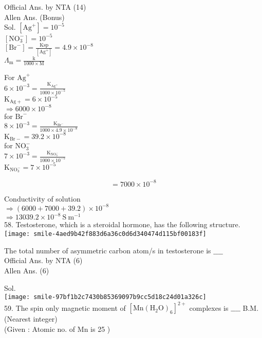 \documentclass[10pt]{article}
\begin{document}
Official Ans. by NTA (14)\\
Allen Ans. (Bonus)\\
Sol. \(\left[\mathrm{Ag}^{+}\right]=10^{-5}\)\\
\(\left[\mathrm{NO}_{3}^{-}\right]=10^{-5}\)\\
\(\left[\mathrm{Br}^{-}\right]=\frac{\mathrm{Ksp}}{\left[\mathrm{Ag}^{+}\right]}=4.9 \times 10^{-8}\)\\
\(\Lambda_{\mathrm{m}}=\frac{\mathrm{k}}{1000 \times \mathrm{M}}\)

For \(\mathrm{Ag}^{+}\)\\
\(6 \times 10^{-3}=\frac{\mathrm{K}_{\mathrm{Ag}^{+}}}{1000 \times 10^{-5}}\)\\
\(\mathrm{K}_{\mathrm{Ag}+}=6 \times 10^{-5}\)\\
\(\Rightarrow 6000 \times 10^{-8}\)\\
for \(\mathrm{Br}^{-}\)\\
\(8 \times 10^{-3}=\frac{\mathrm{K}_{\mathrm{Br}^{-}}}{1000 \times 4.9 \times 10^{-8}}\)\\
\(\mathrm{K}_{\mathrm{Br}-}=39.2 \times 10^{-8}\)\\
for \(\mathrm{NO}_{3}^{-}\)\\
\(7 \times 10^{-3}=\frac{\mathrm{K}_{\mathrm{NO}_{3}^{-}}}{1000 \times 10^{-5}}\)\\
\(\mathrm{K}_{\mathrm{NO}_{3}^{-}}=7 \times 10^{-5}\)

\[
=7000 \times 10^{-8}
\]

Conductivity of solution\\
\(\Rightarrow(6000+7000+39.2) \times 10^{-8}\)\\
\(\Rightarrow 13039.2 \times 10^{-8} \mathrm{~S} \mathrm{~m}^{-1}\)\\
58. Testosterone, which is a steroidal hormone, has the following structure.\\
\texttt{[image: smile-4aed9b42f883d6a36c0d6d340474d115bf00183f]}

The total number of asymmetric carbon atom/s in testosterone is \(\_\_\_\_\)\\
Official Ans. by NTA (6)\\
Allen Ans. (6)

Sol.\\
\texttt{[image: smile-97bf1b2c7430b85369097b9cc5d18c24d01a326c]}\\
59. The spin only magnetic moment of \(\left[\mathrm{Mn}\left(\mathrm{H}_{2} \mathrm{O}\right)_{6}\right]^{2+}\) complexes is \(\_\_\_\_\) B.M. (Nearest integer)\\
(Given : Atomic no. of Mn is 25 )
\end{document}
